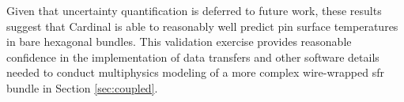 \documentclass[3p,,preprint,11pt]{elsarticle}
\begin{document}
Given that uncertainty quantification is deferred to future work, these results suggest that Cardinal is able to reasonably well predict pin surface temperatures in bare hexagonal bundles. This validation exercise provides reasonable confidence in the implementation of data transfers and other software details needed to conduct multiphysics modeling of a more complex wire-wrapped \gls{sfr} bundle in Section \ref{sec:coupled}.

\begin{comment}
\section{Wire Wrap Bundle Verification}
\label{sec:areva}

Next, Cardinal is validated against water-cooled, electrically-heated wire wrap experiments conducted by AREVA in collaboration with Terrapower, Texas A\&M University, and \gls{anl} through a \gls{doe} project \cite{mays}. In this experiment, a 61-pin bundle is electrically heated at a Reynolds number of 20296. Over 300 thermocouples within the heated pins, at the pin-fluid interfaces, and on the duct inner surface collected temperature measurements with sufficient detail to validate \gls{cfd} methods. Over 30 pressure taps also measured pressure over both integer and partial wire pitch lengths, with taps located on different duct faces in order to measure the expected cross-bundle pressure gradient arising from the wire. 

The bundle contains 61 wire-wrapped pins, of which 18 are heated, 42 are unheated, and 1 is a failed heater pin (with the same construction as the 18 heated pins, but with an inactive heater element). Temperatures were measured with over 300 thermocouples located within the pins, on the pin surfaces, and on the duct inner walls. Pressures were measured with over 30 pressure taps mostly located on the duct inner wall surfaces.

The geometric parameters are given in Table \ref{table:areva}, and correspond to the as-built measurements with a few minor simplifications noted with asterisks. The heated and un-heated pins in the as-built facility have outer diameters that differ by 0.05672 \si{\milli\meter}, or 0.6\%. For simplicity, the \gls{cfd} model treats both the heated and un-heated pins with the same outer diameter taken as the average of the two values. The diameter of the un-heated pins is within the manufacturing tolerance of the heated pins \cite{mays}, so this approximation is expected to have minor effects.


\end{comment}
\end{document}
